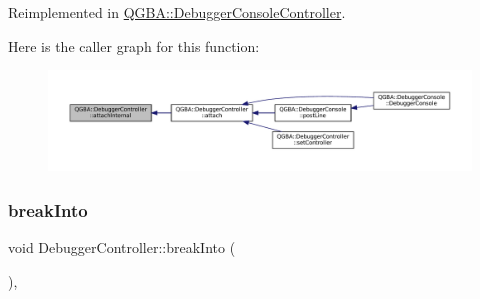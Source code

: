Reimplemented in \mbox{\hyperlink{class_q_g_b_a_1_1_debugger_console_controller_a3a437b392ab1859c47f432e273971f9c}{Q\+G\+B\+A\+::\+Debugger\+Console\+Controller}}.

Here is the caller graph for this function\+:
\nopagebreak
\begin{figure}[H]
\begin{center}
\leavevmode
\includegraphics[width=350pt]{class_q_g_b_a_1_1_debugger_controller_a51748923ae90a2a2f1a5b9dc920f3a37_icgraph}
\end{center}
\end{figure}
\mbox{\label{class_q_g_b_a_1_1_debugger_controller_ad2b19fb1fa3041f510d01f4a0d94e314}} 
\subsubsection{\texorpdfstring{break\+Into}{breakInto}}
{\footnotesize\ttfamily void Debugger\+Controller\+::break\+Into (\begin{DoxyParamCaption}{ }\end{DoxyParamCaption})\hspace{0.3cm}{\ttfamily [virtual]}, {\ttfamily [slot]}}

